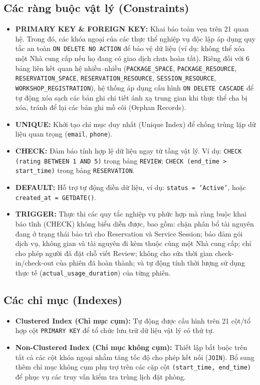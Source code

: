 \subsection{Các ràng buộc vật lý (Constraints)}
\begin{itemize}
    \item \textbf{PRIMARY KEY \& FOREIGN KEY:} Khai báo toàn vẹn trên 21 quan hệ. Trong đó, các khóa ngoại của các thực thể nghiệp vụ độc lập áp dụng quy tắc an toàn \texttt{ON DELETE NO ACTION} để bảo vệ dữ liệu (ví dụ: không thể xóa một Nhà cung cấp nếu họ đang có giao dịch chưa hoàn tất). Riêng đối với 6 bảng liên kết quan hệ nhiều--nhiều (\texttt{PACKAGE\_SPACE}, \texttt{PACKAGE\_RESOURCE}, \texttt{RESERVATION\_SPACE}, \texttt{RESERVATION\_RESOURCE}, \texttt{SESSION\_RESOURCE}, \texttt{WORKSHOP\_REGISTRATION}), hệ thống áp dụng cấu hình \texttt{ON DELETE CASCADE} để tự động xóa sạch các bản ghi chi tiết ánh xạ trung gian khi thực thể cha bị xóa, tránh để lại các bản ghi mồ côi (Orphan Records).
    \item \textbf{UNIQUE:} Khởi tạo chỉ mục duy nhất (Unique Index) để chống trùng lặp dữ liệu quan trọng (\texttt{email}, \texttt{phone}).
    \item \textbf{CHECK:} Đảm bảo tính hợp lệ dữ liệu ngay từ tầng vật lý. Ví dụ: \texttt{CHECK (rating BETWEEN 1 AND 5)} trong bảng \texttt{REVIEW}; \texttt{CHECK (end\_time > start\_time)} trong bảng \texttt{RESERVATION}.
    \item \textbf{DEFAULT:} Hỗ trợ tự động điền dữ liệu, ví dụ: \texttt{status = 'Active'}, hoặc \texttt{created\_at = GETDATE()}.
    \item \textbf{TRIGGER:} Thực thi các quy tắc nghiệp vụ phức hợp mà ràng buộc khai báo tĩnh (CHECK) không biểu diễn được, bao gồm: chặn phân bổ tài nguyên đang ở trạng thái bảo trì cho Reservation và Service Session; bảo đảm gói dịch vụ, không gian và tài nguyên đi kèm thuộc cùng một Nhà cung cấp; chỉ cho phép người đã đặt chỗ viết Review; không cho sửa thời gian check-in/check-out của phiên đã hoàn thành; và tự động tính thời lượng sử dụng thực tế (\texttt{actual\_usage\_duration}) của từng phiên.
\end{itemize}

\subsection{Các chỉ mục (Indexes)}
\begin{itemize}
    \item \textbf{Clustered Index (Chỉ mục cụm):} Tự động được cấu hình trên 21 cột/tổ hợp cột \texttt{PRIMARY KEY} để tổ chức lưu trữ dữ liệu vật lý có thứ tự.
    \item \textbf{Non-Clustered Index (Chỉ mục không cụm):} Thiết lập bắt buộc trên tất cả các cột khóa ngoại nhằm tăng tốc độ cho phép kết nối (\texttt{JOIN}). Bổ sung thêm chỉ mục không cụm phụ trợ trên các cặp cột \texttt{(start\_time, end\_time)} để phục vụ các truy vấn kiểm tra trùng lịch đặt phòng.
\end{itemize}

